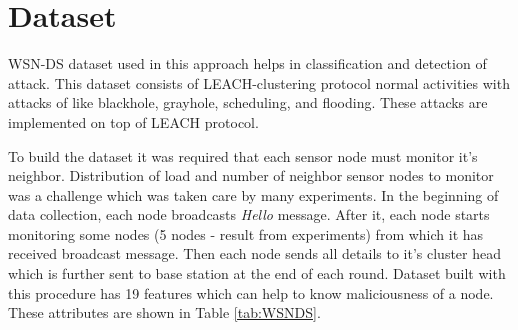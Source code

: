 \section{Dataset} \label{S5.3}
WSN-DS\cite{almomani2016wsn} dataset used in this approach helps in classification and detection of attack. This dataset consists of LEACH-clustering protocol normal activities with attacks of like blackhole, grayhole, scheduling, and flooding. These attacks are implemented on top of LEACH protocol.
\par
To build the dataset it was required that each sensor node must monitor it's neighbor. Distribution of load and number of neighbor sensor nodes to monitor was a challenge which was taken care by many experiments. In the beginning of data collection, each node broadcasts \textit{Hello} message. After it, each node starts monitoring some nodes (5 nodes - result from experiments) from which it has received broadcast message. Then each node sends all details to it's cluster head which is further sent to base station at the end of each round. Dataset built with this procedure has 19 features which can help to know maliciousness of a node. These attributes are shown in Table \ref{tab:WSNDS}.
